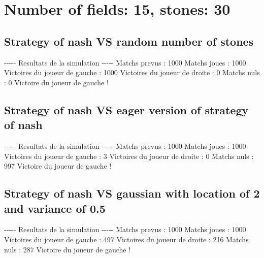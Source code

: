 \documentclass{article}%
\begin{document}
%
\section{Number of fields: 15, stones: 30}%
\label{sec:Number of fields 15, stones 30}%
\subsection{Strategy of nash VS random number of stones}%
\label{subsec:Strategy of nash VS random number of stones}%
{-}{-}{-}{-}{-} Resultats de la simulation {-}{-}{-}{-}{-}\newline%
		\newline%
Matchs prevus : 1000\newline%
Matchs joues : 1000\newline%
\newline%
Victoires du joueur de gauche : 1000\newline%
Victoires du joueur de droite : 0\newline%
Matchs nuls : 0\newline%
\newline%
Victoire du joueur de gauche !

%
\subsection{Strategy of nash VS eager version of strategy of nash}%
\label{subsec:Strategy of nash VS eager version of strategy of nash}%
{-}{-}{-}{-}{-} Resultats de la simulation {-}{-}{-}{-}{-}\newline%
		\newline%
Matchs prevus : 1000\newline%
Matchs joues : 1000\newline%
\newline%
Victoires du joueur de gauche : 3\newline%
Victoires du joueur de droite : 0\newline%
Matchs nuls : 997\newline%
\newline%
Victoire du joueur de gauche !

%
\subsection{Strategy of nash VS gaussian with location of 2 and variance of 0.5}%
\label{subsec:Strategy of nash VS gaussian with location of 2 and variance of 0.5}%
{-}{-}{-}{-}{-} Resultats de la simulation {-}{-}{-}{-}{-}\newline%
		\newline%
Matchs prevus : 1000\newline%
Matchs joues : 1000\newline%
\newline%
Victoires du joueur de gauche : 497\newline%
Victoires du joueur de droite : 216\newline%
Matchs nuls : 287\newline%
\newline%
Victoire du joueur de gauche !
\end{document}
